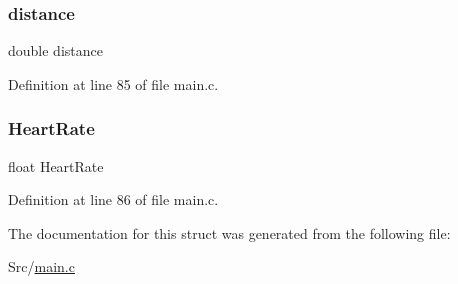 \subsubsection{\texorpdfstring{distance}{distance}}
{\footnotesize\ttfamily double distance}



Definition at line 85 of file main.\+c.

\mbox{\label{struct_main_process_data___a19546b530c18a3d4bba8eafbb4778f69}} 
\subsubsection{\texorpdfstring{Heart\+Rate}{HeartRate}}
{\footnotesize\ttfamily float Heart\+Rate}



Definition at line 86 of file main.\+c.



The documentation for this struct was generated from the following file\+:\begin{DoxyCompactItemize}
\item 
Src/\mbox{\hyperlink{main_8c}{main.\+c}}\end{DoxyCompactItemize}
